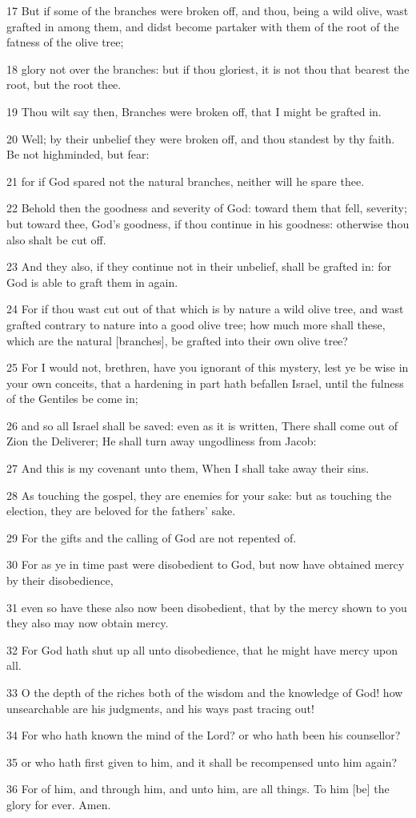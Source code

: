 \par 17 But if some of the branches were broken off, and thou, being a wild olive, wast grafted in among them, and didst become partaker with them of the root of the fatness of the olive tree;
\par 18 glory not over the branches: but if thou gloriest, it is not thou that bearest the root, but the root thee.
\par 19 Thou wilt say then, Branches were broken off, that I might be grafted in.
\par 20 Well; by their unbelief they were broken off, and thou standest by thy faith. Be not highminded, but fear:
\par 21 for if God spared not the natural branches, neither will he spare thee.
\par 22 Behold then the goodness and severity of God: toward them that fell, severity; but toward thee, God's goodness, if thou continue in his goodness: otherwise thou also shalt be cut off.
\par 23 And they also, if they continue not in their unbelief, shall be grafted in: for God is able to graft them in again.
\par 24 For if thou wast cut out of that which is by nature a wild olive tree, and wast grafted contrary to nature into a good olive tree; how much more shall these, which are the natural [branches], be grafted into their own olive tree?
\par 25 For I would not, brethren, have you ignorant of this mystery, lest ye be wise in your own conceits, that a hardening in part hath befallen Israel, until the fulness of the Gentiles be come in;
\par 26 and so all Israel shall be saved: even as it is written, There shall come out of Zion the Deliverer; He shall turn away ungodliness from Jacob:
\par 27 And this is my covenant unto them, When I shall take away their sins.
\par 28 As touching the gospel, they are enemies for your sake: but as touching the election, they are beloved for the fathers' sake.
\par 29 For the gifts and the calling of God are not repented of.
\par 30 For as ye in time past were disobedient to God, but now have obtained mercy by their disobedience,
\par 31 even so have these also now been disobedient, that by the mercy shown to you they also may now obtain mercy.
\par 32 For God hath shut up all unto disobedience, that he might have mercy upon all.
\par 33 O the depth of the riches both of the wisdom and the knowledge of God! how unsearchable are his judgments, and his ways past tracing out!
\par 34 For who hath known the mind of the Lord? or who hath been his counsellor?
\par 35 or who hath first given to him, and it shall be recompensed unto him again?
\par 36 For of him, and through him, and unto him, are all things. To him [be] the glory for ever. Amen.

